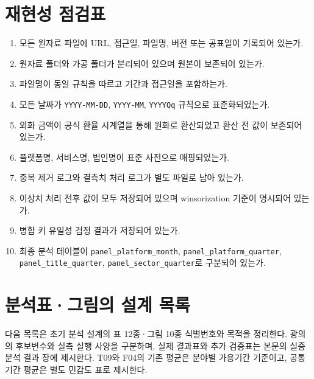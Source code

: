 \documentclass[11pt,a4paper]{report}
\begin{document}
\section{재현성 점검표}
\begin{enumerate}[label=\arabic*.]
  \item 모든 원자료 파일에 URL, 접근일, 파일명, 버전 또는 공표일이 기록되어 있는가.
  \item 원자료 폴더와 가공 폴더가 분리되어 있으며 원본이 보존되어 있는가.
  \item 파일명이 동일 규칙을 따르고 기간과 접근일을 포함하는가.
  \item 모든 날짜가 \texttt{YYYY-MM-DD}, \texttt{YYYY-MM}, \texttt{YYYYQq} 규칙으로 표준화되었는가.
  \item 외화 금액이 공식 환율 시계열을 통해 원화로 환산되었고 환산 전 값이 보존되어 있는가.
  \item 플랫폼명, 서비스명, 법인명이 표준 사전으로 매핑되었는가.
  \item 중복 제거 로그와 결측치 처리 로그가 별도 파일로 남아 있는가.
  \item 이상치 처리 전후 값이 모두 저장되어 있으며 winsorization 기준이 명시되어 있는가.
  \item 병합 키 유일성 검정 결과가 저장되어 있는가.
  \item 최종 분석 테이블이 \nolinkurl{panel_platform_month}, \nolinkurl{panel_platform_quarter}, \nolinkurl{panel_title_quarter}, \nolinkurl{panel_sector_quarter}로 구분되어 있는가.
\end{enumerate}

\section{분석표·그림의 설계 목록}
\label{app:result_design_inventory}
다음 목록은 초기 분석 설계의 표 12종·그림 10종 식별번호와 목적을 정리한다. 광의의 후보변수와 실측 실행 사양을 구분하며, 실제 결과표와 추가 검증표는 본문의 실증분석 결과 장에 제시한다. T09와 F04의 기존 평균은 분야별 가용기간 기준이고, 공통기간 평균은 별도 민감도 표로 제시한다.
\end{document}
